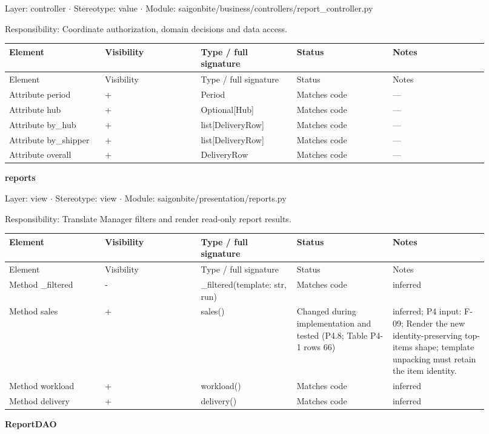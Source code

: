 Layer: controller \ensuremath{\cdot} Stereotype: \guillemotleft{}value\guillemotright{} \ensuremath{\cdot} Module: saigonbite/business/controllers/report\_controller.py

Responsibility: Coordinate authorization, domain decisions and data access.

\begin{longtable}{>{\raggedright\arraybackslash}p{0.1840\linewidth}>{\raggedright\arraybackslash}p{0.1840\linewidth}>{\raggedright\arraybackslash}p{0.1840\linewidth}>{\raggedright\arraybackslash}p{0.1840\linewidth}>{\raggedright\arraybackslash}p{0.1840\linewidth}}
Element & Visibility & Type / full signature & Status & Notes \\
\hline\endfirsthead
Element & Visibility & Type / full signature & Status & Notes \\
\hline\endhead
Attribute period & + & Period & Matches code & --- \\
Attribute hub & + & Optional[Hub] & Matches code & --- \\
Attribute by\_hub & + & list[DeliveryRow] & Matches code & --- \\
Attribute by\_shipper & + & list[DeliveryRow] & Matches code & --- \\
Attribute overall & + & DeliveryRow & Matches code & --- \\
\end{longtable}
\textbf{reports}

Layer: view \ensuremath{\cdot} Stereotype: \guillemotleft{}view\guillemotright{} \ensuremath{\cdot} Module: saigonbite/presentation/reports.py

Responsibility: Translate Manager filters and render read-only report results.

\begin{longtable}{>{\raggedright\arraybackslash}p{0.1840\linewidth}>{\raggedright\arraybackslash}p{0.1840\linewidth}>{\raggedright\arraybackslash}p{0.1840\linewidth}>{\raggedright\arraybackslash}p{0.1840\linewidth}>{\raggedright\arraybackslash}p{0.1840\linewidth}}
Element & Visibility & Type / full signature & Status & Notes \\
\hline\endfirsthead
Element & Visibility & Type / full signature & Status & Notes \\
\hline\endhead
Method \_filtered & - & \_filtered(template: str, run) & Matches code & inferred \\
Method sales & + & sales() & Changed during implementation and tested (P4.8; Table P4-1 rows 66) & inferred; P4 input: F-09; Render the new identity-preserving top-items shape; template unpacking must retain the item identity. \\
Method workload & + & workload() & Matches code & inferred \\
Method delivery & + & delivery() & Matches code & inferred \\
\end{longtable}
\textbf{ReportDAO}

